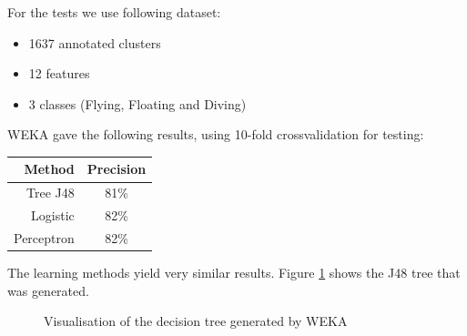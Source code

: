  For the tests we use following dataset:
\begin{itemize}
\item 1637 annotated clusters
\item 12 features
\item 3 classes (Flying, Floating and Diving)
\end{itemize}


WEKA gave the following results, using 10-fold crossvalidation for testing:

\begin{center}
\begin{tabular}{r|c}
	\textnormal{Method} & \textnormal{Precision} \\ \hline 
	Tree J48 & 81\% \\
	Logistic & 82\% \\
  Perceptron & 82\% \\
\end{tabular}
\end{center}


The learning methods yield very similar results. Figure \ref{fig:tree} shows the J48 tree that was generated. 

\begin{figure}
\begin{center}
  \caption{Visualisation of the decision tree generated by WEKA}
  \label{fig:tree}
\end{center}
\end{figure}

